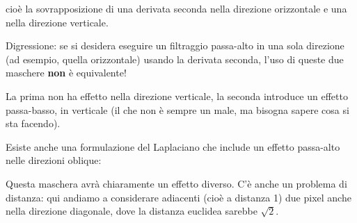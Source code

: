 \documentclass[a4paper,11pt]{article}
\begin{document}
cioè la sovrapposizione di una derivata seconda nella direzione orizzontale e una nella direzione verticale.
\par
Digressione: se si desidera eseguire un filtraggio passa-alto in una sola direzione (ad esempio, quella orizzontale) usando la derivata seconda,
l'uso di queste due maschere \textbf{non} è equivalente!
\newline
\begin{center}
\qquad
{}
\end{center}
La prima non ha effetto nella direzione verticale, la seconda introduce un effetto
passa-basso, in verticale (il che non è sempre un male, ma bisogna sapere cosa si sta facendo).
\par
Esiste anche una formulazione del Laplaciano che include un effetto passa-alto nelle direzioni oblique:
\newline
\begin{center}
\end{center}
Questa maschera avrà chiaramente un effetto diverso. C'è anche un problema di distanza: qui andiamo a considerare adiacenti (cioè a distanza 1) due pixel
anche nella direzione diagonale, dove la distanza euclidea sarebbe $\sqrt{2}$.
\end{document}

